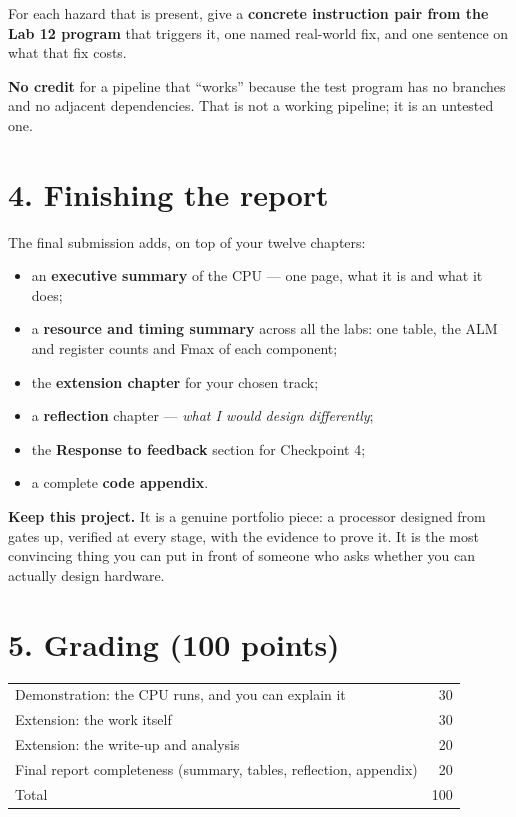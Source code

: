 \documentclass[11pt]{article}
\begin{document}
For each hazard that is present, give a \textbf{concrete instruction pair from the
Lab 12 program} that triggers it, one named real-world fix, and one sentence on
what that fix costs.

\textbf{No credit} for a pipeline that ``works'' because the test program has no
branches and no adjacent dependencies. That is not a working pipeline; it is an
untested one.

\section*{4. Finishing the report}

The final submission adds, on top of your twelve chapters:

\begin{itemize}[leftmargin=1.6em,itemsep=1pt]
\item an \textbf{executive summary} of the CPU --- one page, what it is and what
it does;
\item a \textbf{resource and timing summary} across all the labs: one table, the
ALM and register counts and Fmax of each component;
\item the \textbf{extension chapter} for your chosen track;
\item a \textbf{reflection} chapter --- \emph{what I would design differently};
\item the \textbf{Response to feedback} section for Checkpoint 4;
\item a complete \textbf{code appendix}.
\end{itemize}

\textbf{Keep this project.} It is a genuine portfolio piece: a processor designed
from gates up, verified at every stage, with the evidence to prove it. It is the
most convincing thing you can put in front of someone who asks whether you can
actually design hardware.

\section*{5. Grading (100 points)}

\begin{center}
\begin{tabular}{lr}
\toprule
Demonstration: the CPU runs, and you can explain it & 30 \\
Extension: the work itself & 30 \\
Extension: the write-up and analysis & 20 \\
Final report completeness (summary, tables, reflection, appendix) & 20 \\
\midrule
Total & 100 \\
\bottomrule
\end{tabular}
\end{center}
\end{document}

